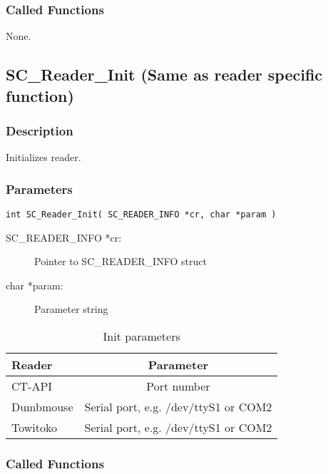 \documentclass[a4paper,oneside]{article}
\begin{document}
\subsubsection*{Called Functions}

None.


\subsection{SC\_Reader\_Init (Same as reader specific function)}

\subsubsection*{Description}

Initializes reader.

\subsubsection*{Parameters}

\begin{verbatim}
int SC_Reader_Init( SC_READER_INFO *cr, char *param )
\end{verbatim}

\begin{description}
\item[SC\_READER\_INFO *cr:] Pointer to SC\_READER\_INFO struct
\item[char *param:] Parameter string
\end{description}

\begin{table}[h!]
\caption{Init parameters}
\begin{center}
\begin{tabular}{|l|c|} \hline
Reader & Parameter \\ \hline \hline
CT-API & Port number \\ \hline
Dumbmouse & Serial port, e.g. /dev/ttyS1 or COM2 \\ \hline
Towitoko & Serial port, e.g. /dev/ttyS1 or COM2 \\ \hline
\end{tabular}
\end{center}
\end{table}

\subsubsection*{Called Functions}
\end{document}
